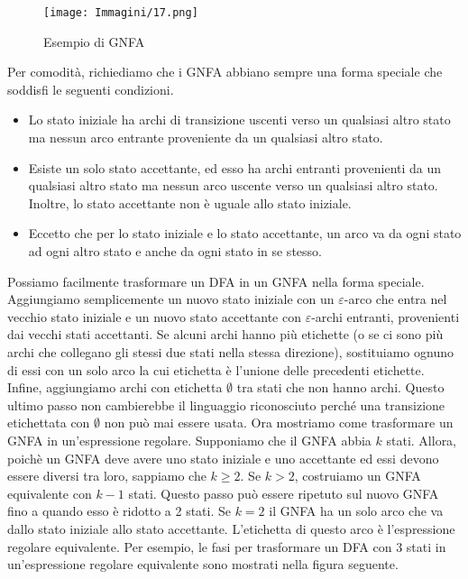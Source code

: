 \documentclass{article}
\begin{document}
\begin{figure}[H]
    \centering
    \texttt{[image: Immagini/17.png]}
    \caption{Esempio di GNFA}
    \label{fig:your_image}
\end{figure}
Per comodità, richiediamo che i GNFA abbiano sempre una forma speciale
che soddisfi le seguenti condizioni.
\begin{itemize}
    \item Lo stato iniziale ha archi di transizione uscenti verso un qualsiasi altro stato ma nessun arco entrante proveniente da un qualsiasi altro stato.
    \item Esiste un solo stato accettante, ed esso ha archi entranti provenienti da un qualsiasi altro stato ma nessun arco uscente verso un qualsiasi altro stato. Inoltre, lo stato accettante non è uguale allo stato iniziale.
    \item Eccetto che per lo stato iniziale e lo stato accettante, un arco va da ogni stato ad ogni altro stato e anche da ogni stato in se stesso.
\end{itemize}

Possiamo facilmente trasformare un DFA in un GNFA nella forma speciale.
Aggiungiamo semplicemente un nuovo stato iniziale con un $\varepsilon$-arco che entra nel vecchio stato iniziale e un nuovo stato accettante con $\varepsilon$-archi entranti, provenienti dai vecchi stati accettanti. 
Se alcuni archi hanno più etichette (o se ci sono più archi che collegano gli stessi due stati nella stessa direzione), sostituiamo ognuno di essi con un solo arco la cui etichetta è l'unione delle precedenti etichette. 
Infine, aggiungiamo archi con etichetta $\emptyset$ tra stati che non hanno archi. 
Questo ultimo passo non cambierebbe il linguaggio riconosciuto perché una transizione etichettata con $\emptyset$ non può mai essere usata.
Ora mostriamo come trasformare un GNFA in un'espressione regolare.
Supponiamo che il GNFA abbia $k$ stati. Allora, poichè un GNFA deve avere uno stato iniziale e uno accettante ed essi devono essere diversi tra loro, sappiamo che $k \geq 2$. Se $k > 2$, costruiamo un GNFA equivalente con $k-1$ stati. Questo passo può essere ripetuto sul nuovo GNFA fino a quando esso è ridotto a 2 stati. Se $k = 2$ il GNFA ha un solo arco che va dallo stato iniziale allo stato accettante. L'etichetta di questo arco è l'espressione regolare equivalente.
Per esempio, le fasi per trasformare un DFA con 3 stati in un'espressione regolare equivalente sono mostrati nella figura seguente.
\end{document}
